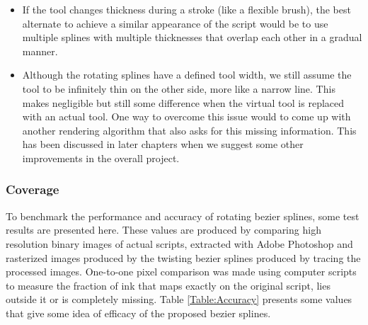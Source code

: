 \begin{itemize}
\item If the tool changes thickness during a stroke (like a flexible brush), the best alternate to achieve a similar appearance of the script would be to use multiple splines with multiple thicknesses that overlap each other in a gradual manner.
\item Although the rotating splines have a defined tool width, we still assume the tool to be infinitely thin on the other side, more like a narrow line. This makes negligible but still some difference when the virtual tool is replaced with an actual tool. One way to overcome this issue would to come up with another rendering algorithm that also asks for this missing information. This has been discussed in later chapters when we suggest some other improvements in the overall project.
\end{itemize}
\subsubsection{Coverage}
To benchmark the performance and accuracy  of rotating bezier splines, some test results are presented here. These values are produced by comparing high resolution binary images of actual scripts, extracted with Adobe Photoshop and rasterized images produced by the twisting bezier splines produced by tracing the processed images. One-to-one pixel comparison was made using computer scripts to measure the fraction of ink that maps exactly on the original script, lies outside it or is completely missing. Table \ref{Table:Accuracy} presents some values that give some idea of efficacy of the proposed bezier splines.
\begin{table}[ht]
\centering
{}
\caption{Benchmark of the mathematical accuracy of the twisting bezier spline curves}
\label{Table:Accuracy}
\end{table}

